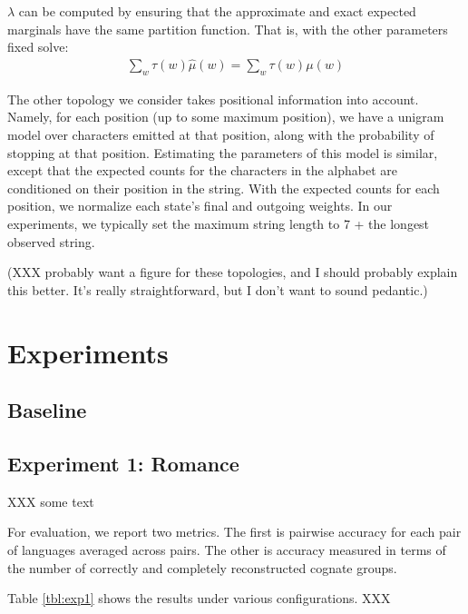 \documentclass[11pt,a4paper]{article}
\begin{document}
$\lambda$ can be computed by ensuring that the
approximate and exact expected marginals have the same partition
function. That is, with the other parameters fixed solve:
\begin{equation*}
  \begin{split}
    \sum_w \tau(w) \hat\mu(w) = \sum_w \tau(w) \mu(w)
  \end{split}
\end{equation*}

The other topology we consider takes positional information into
account. Namely, for each position (up to some maximum position),
we have a unigram model over characters emitted at that position,
along with the probability of stopping at that position. Estimating
the parameters of this model is similar, except that the expected
counts for the characters in the alphabet are conditioned on their
position in the string. With the expected counts for each position,
we normalize each state's final and outgoing weights. In our
experiments, we typically set the maximum string length to 7 + the
longest observed string.

(XXX probably want a figure for these topologies, and I should probably
explain this better. It's really straightforward, but I don't want to sound pedantic.)

\section{Experiments}

\subsection{Baseline}

\subsection{Experiment 1: Romance}

XXX some text


For evaluation, we report two metrics. The first is pairwise accuracy
for each pair of languages averaged across pairs. The other
is accuracy measured in terms of the number of correctly and
completely reconstructed cognate groups. 

Table \ref{tbl:exp1} shows the results under various configurations. XXX
\end{document}
